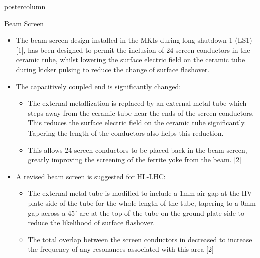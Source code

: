 \documentclass[final,hyperref={pdfpagelabels=false}]{beamer}
\begin{document}
\begin{frame}
\begin{columns}
\begin{column}{.49\textwidth}
\begin{beamercolorbox}[center,wd=\textwidth]{postercolumn}
\begin{minipage}[T]{.95\textwidth}
{\begin{block}{Beam Screen}
\begin{itemize}
\item{The beam screen design installed in the MKIs during long shutdown 1 (LS1) [1], has been designed to permit the inclusion of 24 screen conductors in the ceramic tube, whilst lowering the surface electric field on the ceramic tube during kicker pulsing to reduce the change of surface flashover.}
\item{The capacitively coupled end is significantly changed:}
\begin{itemize}
\item{The external metallization is replaced by an external metal tube which steps away from the ceramic tube near the ends of the screen conductors. This reduces the surface electric field on the ceramic tube significantly. Tapering the length of the conductors also helps this reduction.}
\item{This allows 24 screen conductors to be placed back in the beam screen, greatly improving the screening of the ferrite yoke from the beam. [2]}
\end{itemize}
\item{A revised beam screen is suggested for HL-LHC:}
\begin{itemize}
\item{The external metal tube is modified to include a 1mm air gap at the HV plate side of the tube for the whole length of the tube, tapering to a 0mm gap across a 45$^{\circ}$ arc at the top of the tube on the ground plate side to reduce the likelihood of surface flashover.}
\item{The total overlap between the screen conductors in decreased to increase the frequency of any resonances associated with this area [2]}
\end{itemize}
\end{itemize}

	\end{block}

            \vfill

}
\end{minipage}
\end{beamercolorbox}
\end{column}
\end{columns}
\end{frame}
\end{document}
